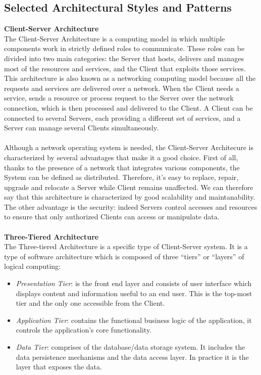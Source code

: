 \documentclass[a4paper, 12pt, oneside, table]{article}
\begin{document}
\subsection{Selected Architectural Styles and Patterns}
\textbf{Client-Server Architecture}\\
The Client-Server Architecture is a computing model in which multiple components work in strictly defined roles to communicate. These roles can be divided into two main categories: the Server that hosts, delivers and manages most of the resources and services, and the Client that exploits those services. This architecture is also known as a networking computing model because all the requests and services are delivered over a network. When the Client needs a service, sends a resource or process request to the Server over the network connection, which is then processed and delivered to the Client. A Client can be connected to several Servers, each providing a different set of services, and a Server can manage several Clients simultaneously.\\
\\
Although a network operating system is needed, the Client-Server Architecure is characterized by several advantages that make it a good choice. First of all, thanks to the presence of a network that integrates various components, the System can be defined as distributed. Therefore, it's easy to replace, repair, upgrade and relocate a Server while Client remains unaffected. We can therefore say that this architecture is characterized by good scalability and maintanability. The other advantage is the security: indeed Servers control accesses and resources to ensure that only authorized Clients can access or manipulate data.\\
\\
\textbf{Three-Tiered Architecture}\\
The Three-tiered Architecture is a specific type of Client-Server system. It is a type of software architecture which is composed of three “tiers” or “layers” of logical computing:
\begin{itemize}
\item \textit{Presentation Tier}: is the front end layer and consists of user interface which displays content and information useful to an end user. This is the top-most tier and the only one accessible from the Client.
\item \textit{Application Tier}: contains the functional business logic of the application, it controls the application’s core functionality.
\item \textit{Data Tier}: comprises of the database/data storage system. It includes the data persistence mechanisms and the data access layer. In practice it is the layer that exposes the data. 
\end{itemize}
\end{document}
